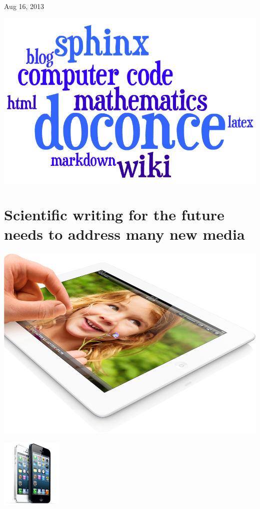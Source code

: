 \documentclass[%
oneside,                 %
final,                   %
chapterprefix=true,      %
open=right               %
10pt]{book}
\begin{document}
\vfill
\clearpage

\begin{center}
Aug 16, 2013
\end{center}

\vspace{1cm}



\begin{center}  %
  \centerline{\includegraphics[width=0.5\linewidth]{../doc/slides/fig/doconce1b.png}}
\end{center}


\section{Scientific writing for the future needs to address many new media}


\begin{center}  %
  \centerline{\includegraphics[width=0.8\linewidth]{../doc/slides/fig/ipad.png}}
\end{center}



\begin{center}  %
  \centerline{\includegraphics[width=0.3\linewidth]{../doc/slides/fig/iphones.jpg}}
\end{center}
\end{document}

